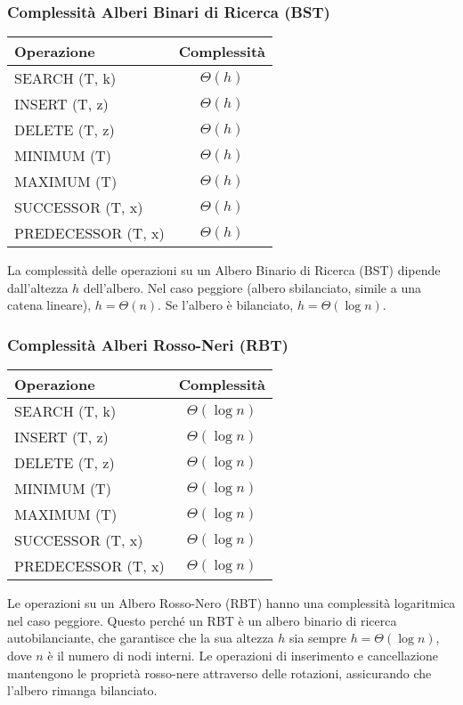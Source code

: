 \subsubsection{Complessità Alberi Binari di Ricerca (BST)}

\begin{tabular}{|l|c|}
\hline
\textbf{Operazione} & \textbf{Complessità} \\
\hline
SEARCH (T, k) & $\Theta(h)$ \\
\hline
INSERT (T, z) & $\Theta(h)$ \\
\hline
DELETE (T, z) & $\Theta(h)$ \\
\hline
MINIMUM (T) & $\Theta(h)$ \\
\hline
MAXIMUM (T) & $\Theta(h)$ \\
\hline
SUCCESSOR (T, x) & $\Theta(h)$ \\
\hline
PREDECESSOR (T, x) & $\Theta(h)$ \\
\hline
\end{tabular}

\vspace{2mm}
\footnotesize{La complessità delle operazioni su un Albero Binario di Ricerca (BST) dipende dall'altezza $h$ dell'albero. Nel caso peggiore (albero sbilanciato, simile a una catena lineare), $h = \Theta(n)$. Se l'albero è bilanciato, $h = \Theta(\log n)$.}

\subsubsection{Complessità Alberi Rosso-Neri (RBT)}

\begin{tabular}{|l|c|}
\hline
\textbf{Operazione} & \textbf{Complessità} \\
\hline
SEARCH (T, k) & $\Theta(\log n)$ \\
\hline
INSERT (T, z) & $\Theta(\log n)$ \\
\hline
DELETE (T, z) & $\Theta(\log n)$ \\
\hline
MINIMUM (T) & $\Theta(\log n)$ \\
\hline
MAXIMUM (T) & $\Theta(\log n)$ \\
\hline
SUCCESSOR (T, x) & $\Theta(\log n)$ \\
\hline
PREDECESSOR (T, x) & $\Theta(\log n)$ \\
\hline
\end{tabular}

\vspace{2mm}
\footnotesize{Le operazioni su un Albero Rosso-Nero (RBT) hanno una complessità logaritmica nel caso peggiore. Questo perché un RBT è un albero binario di ricerca autobilanciante, che garantisce che la sua altezza $h$ sia sempre $h = \Theta(\log n)$, dove $n$ è il numero di nodi interni. Le operazioni di inserimento e cancellazione mantengono le proprietà rosso-nere attraverso delle rotazioni, assicurando che l'albero rimanga bilanciato.}